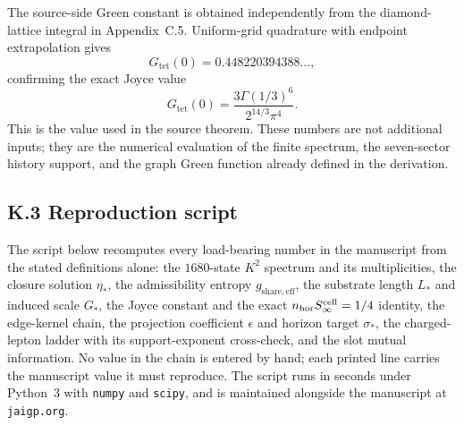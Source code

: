 \documentclass[11pt]{article}
\begin{document}
The source-side Green constant is obtained independently from the diamond-lattice integral in Appendix~C.5. Uniform-grid quadrature with endpoint extrapolation gives
\[
G_{\mathrm{tet}}(0)=0.448220394388\ldots ,
\]
confirming the exact Joyce value
\[
G_{\mathrm{tet}}(0)
=
\frac{3\Gamma(1/3)^6}{2^{14/3}\pi^4}.
\]
This is the value used in the source theorem. These numbers are not additional inputs; they are the numerical evaluation of the finite spectrum, the seven-sector history support, and the graph Green function already defined in the derivation.

\subsection*{K.3 Reproduction script}

The script below recomputes every load-bearing number in the manuscript from the stated definitions alone: the $1680$-state $K^2$ spectrum and its multiplicities, the closure solution $\eta_*$, the admissibility entropy $g_{\mathrm{share,eff}}$, the substrate length $L_*$ and induced scale $G_*$, the Joyce constant and the exact $n_{\rm hor}S_\infty^{\rm cell}=1/4$ identity, the edge-kernel chain, the projection coefficient $\epsilon$ and horizon target $\sigma_*$, the charged-lepton ladder with its support-exponent cross-check, and the slot mutual information. No value in the chain is entered by hand; each printed line carries the manuscript value it must reproduce. The script runs in seconds under Python~3 with \texttt{numpy} and \texttt{scipy}, and is maintained alongside the manuscript at \texttt{jaigp.org}.
\end{document}
